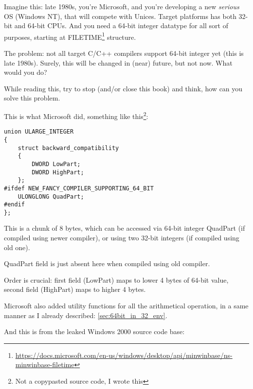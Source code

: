 \label{LargeInteger}

Imagine this: late 1980s, you're Microsoft, and you're developing a new \emph{serious} \ac{OS} (Windows NT),
that will compete with Unices.
Target platforms has both 32-bit and 64-bit CPUs.
And you need a 64-bit integer datatype for all sort of purposes, starting at
FILETIME\footnote{\url{https://docs.microsoft.com/en-us/windows/desktop/api/minwinbase/ns-minwinbase-filetime}} structure.

The problem: not all target C/C++ compilers support 64-bit integer yet (this is late 1980s).
Surely, this will be changed in (near) future, but not now.
What would you do?

While reading this, try to stop (and/or close this book) and think, how can you solve this problem.

\clearpage

This is what Microsoft did, something like this\footnote{Not a copypasted source code, I wrote this}:

\begin{lstlisting}
union ULARGE_INTEGER
{
    struct backward_compatibility
    {
        DWORD LowPart;
        DWORD HighPart;
    };
#ifdef NEW_FANCY_COMPILER_SUPPORTING_64_BIT
    ULONGLONG QuadPart;
#endif
};
\end{lstlisting}

This is a chunk of 8 bytes, which can be accessed via 64-bit integer QuadPart (if compiled using newer compiler),
or using two 32-bit integers (if compiled using old one).

QuadPart field is just absent here when compiled using old compiler.

Order is crucial: first field (LowPart) maps to lower 4 bytes of 64-bit value, second field (HighPart) maps to higher 4 bytes.

Microsoft also added utility functions for all the arithmetical operation, in a same manner as I already described:
\ref{sec:64bit_in_32_env}.

And this is from the leaked Windows 2000 source code base:

